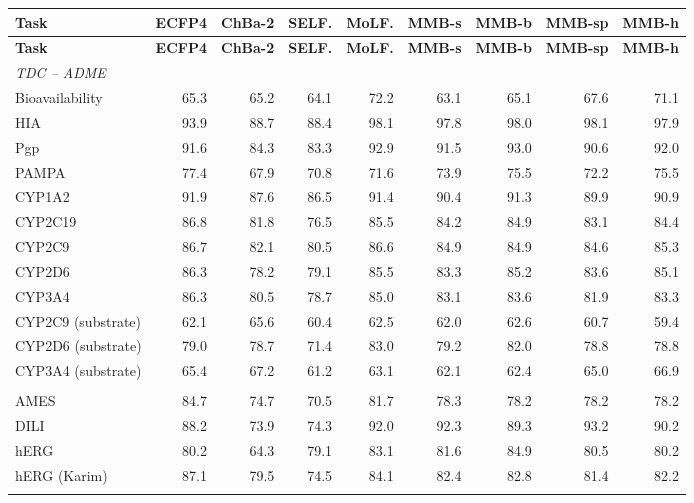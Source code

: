 {\footnotesize\setlength{\tabcolsep}{3.5pt}
\begin{longtable}{l r r r r r r r r }
  \toprule
  \textbf{Task} & \textbf{ECFP4} & \textbf{ChBa-2} & \textbf{SELF.} & \textbf{MoLF.} & \textbf{MMB-s} & \textbf{MMB-b} & \textbf{MMB-sp} & \textbf{MMB-h} \\
  \midrule
  \endfirsthead
  \toprule
  \textbf{Task} & \textbf{ECFP4} & \textbf{ChBa-2} & \textbf{SELF.} & \textbf{MoLF.} & \textbf{MMB-s} & \textbf{MMB-b} & \textbf{MMB-sp} & \textbf{MMB-h} \\
  \midrule
  \endhead
  \multicolumn{9}{l}{\textit{TDC -- ADME}} \\
  Bioavailability & 65.3 & 65.2 & 64.1 & 72.2 & 63.1 & 65.1 & 67.6 & 71.1 \\
  HIA & 93.9 & 88.7 & 88.4 & 98.1 & 97.8 & 98.0 & 98.1 & 97.9 \\
  Pgp & 91.6 & 84.3 & 83.3 & 92.9 & 91.5 & 93.0 & 90.6 & 92.0 \\
  PAMPA & 77.4 & 67.9 & 70.8 & 71.6 & 73.9 & 75.5 & 72.2 & 75.5 \\
  CYP1A2 & 91.9 & 87.6 & 86.5 & 91.4 & 90.4 & 91.3 & 89.9 & 90.9 \\
  CYP2C19 & 86.8 & 81.8 & 76.5 & 85.5 & 84.2 & 84.9 & 83.1 & 84.4 \\
  CYP2C9 & 86.7 & 82.1 & 80.5 & 86.6 & 84.9 & 84.9 & 84.6 & 85.3 \\
  CYP2D6 & 86.3 & 78.2 & 79.1 & 85.5 & 83.3 & 85.2 & 83.6 & 85.1 \\
  CYP3A4 & 86.3 & 80.5 & 78.7 & 85.0 & 83.1 & 83.6 & 81.9 & 83.3 \\
  CYP2C9 (substrate) & 62.1 & 65.6 & 60.4 & 62.5 & 62.0 & 62.6 & 60.7 & 59.4 \\
  CYP2D6 (substrate) & 79.0 & 78.7 & 71.4 & 83.0 & 79.2 & 82.0 & 78.8 & 78.8 \\
  CYP3A4 (substrate) & 65.4 & 67.2 & 61.2 & 63.1 & 62.1 & 62.4 & 65.0 & 66.9 \\
  \addlinespace
  \multicolumn{9}{l}{\textit{TDC -- Toxicity}} \\
  AMES & 84.7 & 74.7 & 70.5 & 81.7 & 78.3 & 78.2 & 78.2 & 78.2 \\
  DILI & 88.2 & 73.9 & 74.3 & 92.0 & 92.3 & 89.3 & 93.2 & 90.2 \\
  hERG & 80.2 & 64.3 & 79.1 & 83.1 & 81.6 & 84.9 & 80.5 & 80.2 \\
  hERG (Karim) & 87.1 & 79.5 & 74.5 & 84.1 & 82.4 & 82.8 & 81.4 & 82.2 \\
  \addlinespace
  \multicolumn{9}{l}{\textit{TDC -- HTS}} \\

\end{longtable}}
